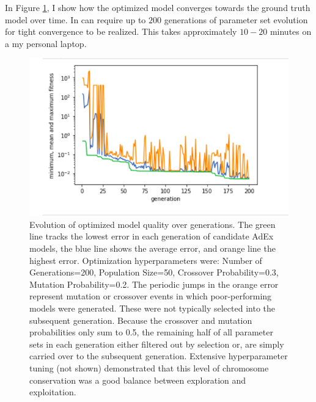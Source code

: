 In Figure \ref{fig:optimizer-evolution}, I show how the optimized model converges towards the ground truth model over time.
In can require up to $200$ generations of parameter set evolution for tight convergence to be realized.
This takes approximately $10-20$ minutes on a my personal laptop.



\begin{figure}
    \centering
    \includegraphics[scale=0.7]{figures/optimizer_internal_validation}
    \caption[Optimizer error over generations]{Evolution of optimized model quality over generations.
    The green line tracks the lowest error in each generation of candidate AdEx models, the blue line shows the average error, and orange line the highest error.
    Optimization hyperparameters were: Number of Generations=200, Population Size=50, Crossover Probability=0.3, Mutation Probability=0.2.
    The periodic jumps in the orange error represent mutation or crossover events in which poor-performing models were generated.
    These were not typically selected into the subsequent generation.
    Because the crossover and mutation probabilities only sum to 0.5, the remaining half of all parameter sets in each generation either filtered out by selection or, are simply carried over to the subsequent generation.
    Extensive hyperparameter tuning (not shown) demonstrated that this level of chromosome conservation was a good balance between exploration and exploitation.}
    \label{fig:optimizer-evolution}
\end{figure}

